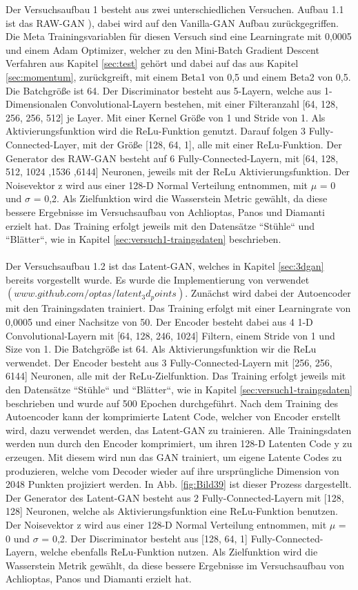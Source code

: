 \documentclass{llncs}
\begin{document}
Der Versuchsaufbau 1 besteht aus zwei unterschiedlichen Versuchen. Aufbau 1.1 ist das RAW-GAN \cite{3dgan}), dabei wird auf den Vanilla-GAN Aufbau zurückgegriffen. Die Meta Trainingsvariablen für diesen Versuch sind eine Learningrate mit 0,0005 und einem Adam Optimizer, welcher zu den Mini-Batch Gradient Descent Verfahren aus Kapitel \ref{sec:test} gehört und dabei auf das aus Kapitel \ref{sec:momentum}, zurückgreift, mit einem Beta1 von 0,5 und einem Beta2 von 0,5. Die Batchgröße ist 64. Der Discriminator besteht aus 5-Layern, welche aus 1-Dimensionalen Convolutional-Layern bestehen, mit einer Filteranzahl [64, 128, 256, 256, 512] je Layer. Mit einer Kernel Größe von 1 und Stride von 1. Als Aktivierungsfunktion wird die ReLu-Funktion genutzt. Darauf folgen 3 Fully-Connected-Layer, mit der Größe [128, 64, 1], alle mit einer ReLu-Funktion. Der Generator des RAW-GAN besteht auf 6 Fully-Connected-Layern, mit [64, 128, 512, 1024 ,1536 ,6144] Neuronen, jeweils mit der ReLu Aktivierungsfunktion. Der Noisevektor z wird aus einer 128-D Normal Verteilung entnommen, mit $\mu$ = 0 und $\sigma$ =  0,2. Als Zielfunktion wird die Wasserstein Metric gewählt, da diese bessere Ergebnisse im Versuchsaufbau von Achlioptas, Panos und Diamanti \cite{3dgan} erzielt hat. Das Training erfolgt jeweils mit den Datensätze ``Stühle`` und ``Blätter``, wie in Kapitel \ref{sec:versuch1-traingsdaten} beschrieben.
\\\\
Der Versuchsaufbau 1.2 ist das Latent-GAN, welches in Kapitel \ref{sec:3dgan} bereits vorgestellt wurde. Es wurde die Implementierung von \cite{3dgan} verwendet $(www.github.com/optas/latent_3d_points)$. Zunächst wird dabei der Autoencoder mit den Trainingsdaten trainiert. Das Training erfolgt mit einer Learningrate von 0,0005 und einer Nachsitze von 50. Der Encoder besteht dabei aus 4 1-D Convolutional-Layern mit [64, 128, 246, 1024] Filtern, einem Stride von 1 und Size von 1. Die Batchgröße ist 64. Als Aktivierungsfunktion wir die ReLu verwendet. Der Encoder besteht aus 3 Fully-Connected-Layern mit [256, 256, 6144] Neuronen, alle mit der ReLu-Zielfunktion. Das Training erfolgt jeweils mit den Datensätze ``Stühle`` und ``Blätter``, wie in Kapitel \ref{sec:versuch1-traingsdaten} beschrieben und wurde auf 500 Epochen durchgeführt. Nach dem Training des Autoencoder kann der komprimierte Latent Code, welcher von Encoder erstellt wird, dazu verwendet werden, das Latent-GAN zu trainieren. Alle Trainingsdaten werden nun durch den Encoder komprimiert, um ihren 128-D Latenten Code y zu erzeugen. Mit diesem wird nun das GAN trainiert, um eigene Latente Codes zu produzieren, welche vom Decoder wieder auf ihre ursprüngliche Dimension von 2048 Punkten projiziert werden. In Abb. \ref{fig:Bild39} ist dieser Prozess dargestellt. Der Generator des Latent-GAN besteht aus 2 Fully-Connected-Layern mit [128, 128] Neuronen, welche als Aktivierungsfunktion eine ReLu-Funktion benutzen. Der Noisevektor z wird aus einer 128-D Normal Verteilung entnommen, mit $\mu$ = 0 und $\sigma$ =  0,2. Der Discriminator besteht aus [128, 64, 1] Fully-Connected-Layern, welche ebenfalls ReLu-Funktion nutzen. Als Zielfunktion wird die Wasserstein Metrik gewählt, da diese bessere Ergebnisse im Versuchsaufbau von Achlioptas, Panos und Diamanti\cite{3dgan} erzielt hat. 
\end{document}
